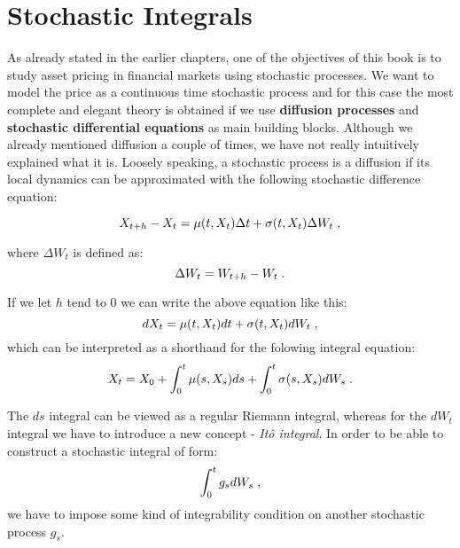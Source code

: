 \documentclass[times, utf8, diplomski]{fer}
\begin{document}
\section{Stochastic Integrals}
As already stated in the earlier chapters, one of the objectives of this book is to study asset pricing in financial markets using stochastic processes. We want to model the price as a continuous time stochastic process and for this case the most complete and elegant theory is obtained if we use \textbf{diffusion processes} and \textbf{stochastic differential equations} as main building blocks. Although we already mentioned diffusion a couple of times, we have not really intuitively explained what it is. Loosely speaking, a stochastic process is a diffusion if its local dynamics can be approximated with the following stochastic difference equation:

\begin{equation}
	X_{t+h} - X_t = \mu(t,X_t)\Delta t + \sigma(t, X_t)\Delta W_t\hspace{0.1cm},
\end{equation}

\noindent where $\Delta W_t$ is defined as:
\begin{equation}
	\Delta W_t = W_{t+h} - W_t\hspace{0.1cm}.
\end{equation}

\noindent If we let $h$ tend to $0$ we can write the above equation like this:
\begin{equation}
	dX_t = \mu(t,X_t)dt + \sigma(t, X_t)dW_t\hspace{0.1cm},
\end{equation}
\noindent which can be interpreted as a shorthand for the folowing integral equation:
\begin{equation}
	X_t = X_0 + \int_0^t \mu(s,X_s)ds + \int_0^t \sigma(s,X_s)dW_s\hspace{0.1cm}.
\end{equation}

\noindent The $ds$ integral can be viewed as a regular Riemann integral, whereas for the $dW_t$ integral we have to introduce a new concept - \textit{It\^{o} integral}.
In order to be able to construct a stochastic integral of form:
\begin{equation}
	\int_0^t g_sdW_s\hspace{0.1cm},
\end{equation}
\noindent we have to impose some kind of integrability condition on another stochastic process $g_s$.
\end{document}
